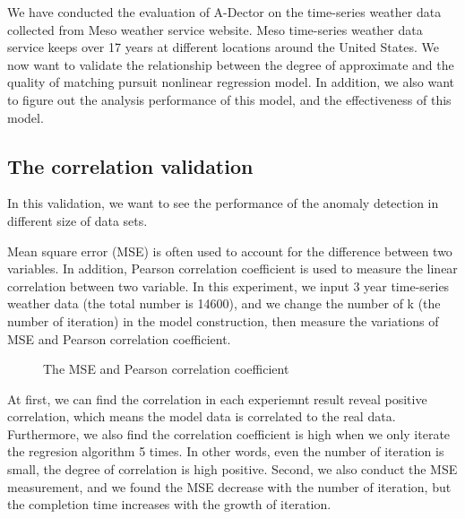 \documentclass{vgtc}                          %
\begin{document}
We have conducted the evaluation of A-Dector on the time-series weather data collected from Meso weather service website. Meso time-series weather data service keeps over 17 years at different locations around the United States. We now want to validate the relationship between the degree of approximate and the quality of matching pursuit nonlinear regression model. In addition, we also want to figure out the analysis performance of this model, and the effectiveness of this model.

\subsection{The correlation validation}

	In this validation, we want to see the performance of the anomaly detection in different size of data sets. 

Mean square error (MSE) is often used to account for the difference between two variables. In addition, Pearson correlation coefficient is used to measure the linear correlation between two variable. In this experiment, we input 3 year time-series weather data (the total number is 14600), and we change the number of k (the number of iteration) in the model construction, then measure the variations of MSE and Pearson correlation coefficient. 
\begin{figure}[htb]
	\caption{The MSE and Pearson correlation coefficient}
\end{figure}

	At first, we can find the correlation in each experiemnt result reveal positive correlation, which means the model data is correlated to the real data. Furthermore, we also find the correlation coefficient is high when we only iterate the regresion algorithm 5 times. In other words, even the number of iteration is small, the degree of correlation is high positive. Second, we also conduct the MSE measurement, and we found the MSE decrease with the number of iteration, but the completion time increases with the growth of iteration.
	
\end{document}
